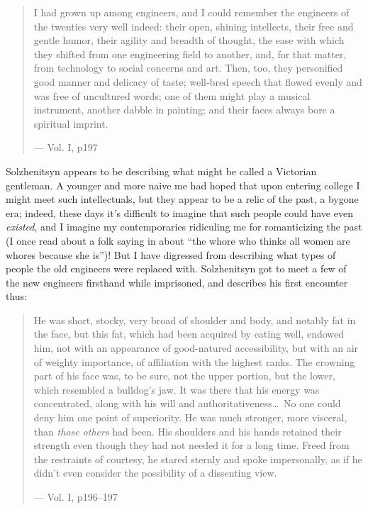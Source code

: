 \documentclass{article}
\begin{document}
\begin{quote}
I had grown up among engineers, and I could remember the engineers of the twenties very well indeed: their open, shining intellects, their free and gentle humor, their agility and breadth of thought, the ease with which they shifted from one engineering field to another, and, for that matter, from technology to social concerns and art.  Then, too, they personified good manner and delicacy of taste; well-bred speech that flowed evenly and was free of uncultured words; one of them might play a musical instrument, another dabble in painting; and their faces always bore a spiritual imprint.

--- Vol. I, p197
\end{quote}

Solzhenitsyn appears to be describing what might be called a Victorian gentleman.  A younger and more naive me had hoped that upon entering college I might meet such intellectuals, but they appear to be a relic of the past, a bygone era; indeed, these days it's difficult to imagine that such people could have even \emph{existed}, and I imagine my contemporaries ridiculing me for romanticizing the past (I once read about a folk saying in  about ``the whore who thinks all women are whores because she is'')!  But I have digressed from describing what types of people the old engineers were replaced with.  Solzhenitsyn got to meet a few of the new engineers firsthand while imprisoned, and describes his first encounter thus:

\begin{quote}
He was short, stocky, very broad of shoulder and body, and notably fat in the face, but this fat, which had been acquired by eating well, endowed him, not with an appearance of good-natured accessibility, but with an air of weighty importance, of affiliation with the highest ranks.  The crowning part of his face was, to be sure, not the upper portion, but the lower, which resembled a bulldog's jaw.  It was there that his energy was concentrated, along with his will and authoritativeness\ldots~No one could deny him one point of superiority.  He was much stronger, more visceral, than \emph{those others} had been.  His shoulders and his hands retained their strength even though they had not needed it for a long time.  Freed from the restraints of courtesy, he stared sternly and spoke impersonally, as if he didn't even consider the possibility of a dissenting view.

--- Vol. I, p196--197
\end{quote}
\end{document}
